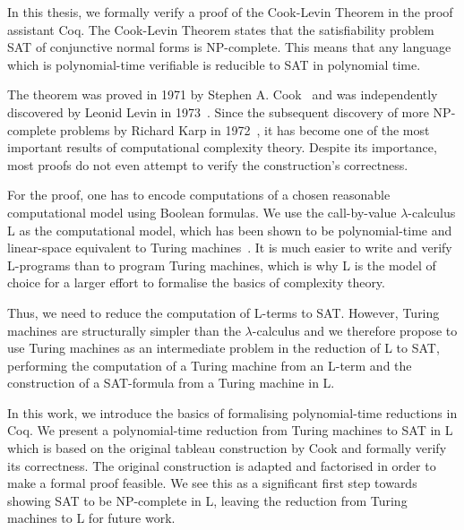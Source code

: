 In this thesis, we formally verify a proof of the Cook-Levin Theorem in the proof assistant Coq.
The Cook-Levin Theorem states that the satisfiability problem SAT of conjunctive normal forms is NP-complete. 
This means that any language which is polynomial-time verifiable is reducible to SAT in polynomial time. 

The theorem was proved in 1971 by Stephen A. Cook~\cite{cook_theorem} and was independently discovered by Leonid Levin in 1973~\cite{levin_theorem}.
Since the subsequent discovery of more NP-complete problems by Richard Karp in 1972~\cite{Karp1972}, it has become one of the most important results of computational complexity theory.
Despite its importance, most proofs do not even attempt to verify the construction's correctness.

For the proof, one has to encode computations of a chosen reasonable computational model using Boolean formulas. 
We use the call-by-value $\lambda$-calculus L as the computational model, which has been shown to be polynomial-time and linear-space equivalent to Turing machines~\cite{ForsterKunzeRoth:2019:wcbv-Reasonable}. It is much easier to write and verify L-programs than to program Turing machines, which is why L is the model of choice for a larger effort to formalise the basics of complexity theory.

Thus, we need to reduce the computation of L-terms to SAT\@.
However, Turing machines are structurally simpler than the $\lambda$-calculus and we therefore propose to use Turing machines as an intermediate problem in the reduction of L to SAT, performing the computation of a Turing machine from an L-term and the construction of a SAT-formula from a Turing machine in L.

In this work, we introduce the basics of formalising polynomial-time reductions in Coq. We present a polynomial-time reduction from Turing machines to SAT in L which is based on the original tableau construction by Cook and formally verify its correctness. The original construction is adapted and factorised in order to make a formal proof feasible. We see this as a significant first step towards showing SAT to be NP-complete in L, leaving the reduction from Turing machines to L for future work.
